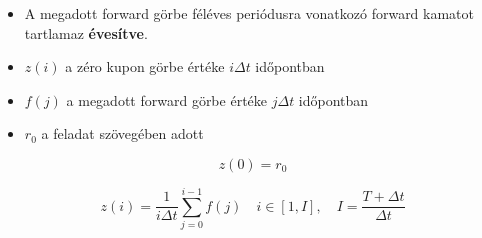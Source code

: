 \documentclass{article}
\begin{document}
\begin{itemize}
\item A megadott forward görbe féléves periódusra vonatkozó forward kamatot tartlamaz \textbf{évesítve}.
\item $z(i)$ a zéro kupon görbe értéke $i \Delta t$ időpontban
\item $f(j)$ a megadott forward görbe értéke $j \Delta t$ időpontban
\item $r_0$ a feladat szövegében adott
\end{itemize}

\begin{equation}
z(0) = r_0
\end{equation}

\begin{equation}
z(i) = \frac{1}{i \Delta t} \sum_{j=0}^{i-1} f(j) \quad i \in [1, I], \quad I = \frac{T + \Delta t}{\Delta t}
\end{equation}
\end{document}
